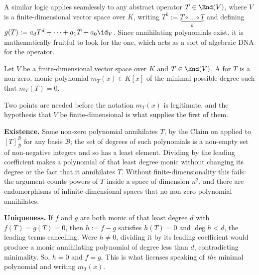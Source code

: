 A similar logic applies seamlessly to any abstract operator $T \in \End(V)$, where $V$ is a finite-di\-men\-sional vector space over $K$, writing $T^k := \underbrace{T \circ \dots \circ T}_{k}$ and defining $g(T) := a_d T^d + \dots + a_1 T + a_0 \id_V$. Since annihilating polynomials exist, it is mathematically fruitful to look for the  one, which acts as a sort of algebraic DNA for the operator.

\begin{definition}
  \label{def:minimal_poly}
  Let $V$ be a finite-di\-men\-sional vector space over $K$ and $T \in \End(V)$. A  for $T$ is a non-zero, monic polynomial $m_T(x) \in K[x]$ of the minimal possible degree such that $m_T(T) = 0$.
\end{definition}

\begin{remark}
\label{rem:minimal_poly_well_defined}
Two points are needed before the notation $m_T(x)$ is legitimate, and the hypothesis that $V$ be finite-di\-men\-sional is what supplies the first of them.

\textbf{Existence.} Some non-zero polynomial annihilates $T$, by the Claim on  applied to $[T]_{\mathcal{B}}^{\mathcal{B}}$ for any basis $\mathcal{B}$; the set of degrees of such polynomials is a non-empty set of non-negative integers and so has a least element. Dividing by the leading coefficient makes a polynomial of that least degree monic without changing its degree or the fact that it annihilates $T$. Without finite-di\-men\-sionality this fails: the argument counts powers of $T$ inside a space of dimension $n^2$, and there are endomorphisms of infinite-di\-men\-sional spaces that no non-zero polynomial annihilates.

\textbf{Uniqueness.} If $f$ and $g$ are both monic of that least degree $d$ with $f(T) = g(T) = 0$, then $h := f - g$ satisfies $h(T) = 0$ and $\deg h < d$, the leading terms cancelling. Were $h \ne 0$, dividing it by its leading coefficient would produce a monic annihilating polynomial of degree less than $d$, contradicting minimality. So, $h = 0$ and $f = g$. This is what licenses speaking of \emph{the} minimal polynomial and writing $m_T(x)$.
\end{remark}

